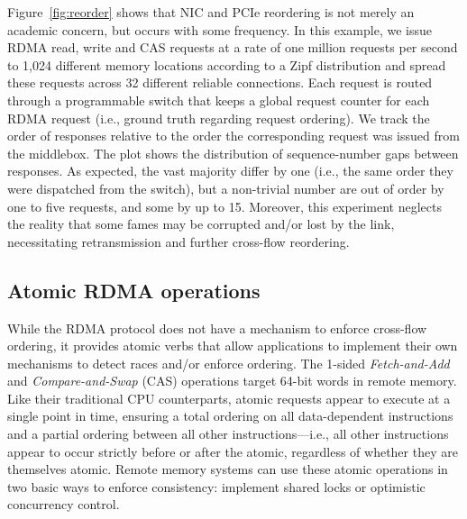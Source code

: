 Figure~\ref{fig:reorder} shows that NIC
and PCIe reordering is not merely an academic concern, but occurs with
some frequency.  In this example, we issue RDMA read, write and CAS
requests at a rate of one million requests per second to 1,024
different memory locations according to a Zipf distribution and spread
these requests across 32 different reliable connections. Each request is routed
through a programmable switch that keeps a global request counter for
each RDMA request (i.e., ground truth regarding request ordering). We
track the order of responses relative to the order the corresponding
request was issued from the middlebox. The plot shows the distribution
of sequence-number gaps between responses. As expected, the vast
majority differ by one (i.e., the same order they were dispatched from
the switch), but a non-trivial number are out of order by one to five
requests, and some by up to 15.  Moreover, this experiment neglects
the reality that some fames may be corrupted and/or lost by the link,
necessitating retransmission and further cross-flow reordering.






\subsection{Atomic RDMA operations} 

While the RDMA protocol does not have a mechanism to enforce
cross-flow ordering, it provides atomic verbs that allow applications
to implement their own mechanisms to detect races and/or enforce
ordering.  The 1-sided \textit{Fetch-and-Add} and
\textit{Compare-and-Swap} (CAS) operations target 64-bit words in
remote memory.  Like their traditional CPU counterparts, atomic
requests appear to execute at a single point in time, ensuring a total
ordering on all data-dependent instructions and a partial ordering
between all other instructions---i.e., all other instructions appear
to occur strictly before or after the atomic, regardless of whether
they are themselves atomic.  Remote memory systems can use these
atomic operations in two basic ways to enforce consistency: implement
shared locks or optimistic concurrency control.

